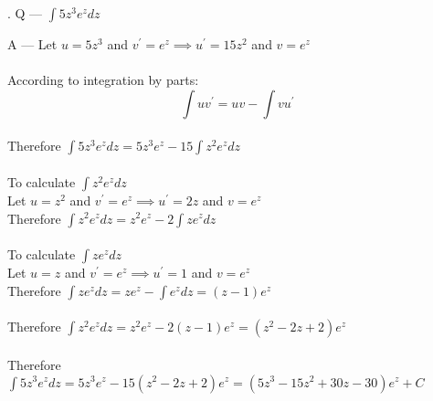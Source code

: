 \documentclass{article}
\newcounter{question}
\begin{document}
\newcommand\Que[1]{%
   \leavevmode\par
   \stepcounter{question}
   \noindent
   \thequestion. Q --- #1\par}

\newcommand\Ans[2][]{%
    \leavevmode\par\noindent
   {A --- \textbf{#1}#2\par}}

\Que{ $ \int{5z^3e^{z}} dz $ }
\Ans
{
Let $ u = 5z^3 $ and $ v^{\prime} = e^{z} 
\implies u^{\prime} = 15z^2 $ and $ v = e^z $\\\\

According to integration by parts:\\
$$\int{uv^{\prime}}=uv-\int{vu^{\prime}}$$\\

Therefore $ \int{5z^3e^{z}} dz 
= 5z^3e^z - 15 \int{ z^2e^z } dz $\\\\

To calculate $ \int{ z^2e^z } dz $\\

Let $ u = z^2 $ and $ v^{\prime} = e^z 
\implies u^{\prime} = 2z $ and $ v = e^z $\\

Therefore $ \int{ z^2e^z } dz 
= z^2e^z - 2 \int{ze^z} dz $\\\\

To calculate $ \int{ ze^z } dz $\\

Let $ u = z $ and $ v^{\prime} = e^z 
\implies u^{\prime} = 1 $ and $ v = e^z $\\

Therefore $ \int{ ze^z } dz 
= ze^z - \int{e^z} dz 
= (z-1)e^z $\\\\

Therefore $ \int{ z^2e^z } dz 
= z^2e^z - 2 (z-1)e^z 
= (z^2-2z+2)e^z $\\\\

Therefore $ \int{5z^3e^{z}} dz 
= 5z^3e^z - 15(z^2-2z+2)e^z
= (5z^3 - 15z^2 + 30z - 30)e^z + C $\\\\

}
\end{document}
